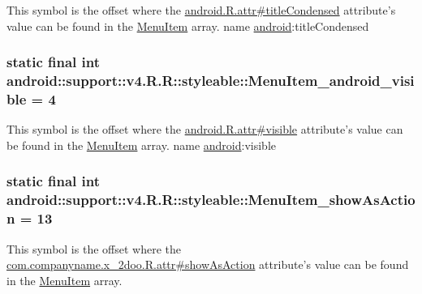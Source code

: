 This symbol is the offset where the \hyperlink{}{android.R.attr\#titleCondensed} attribute's value can be found in the \hyperlink{classandroid_1_1support_1_1v4_1_1_r_1_1styleable_05493a7eeaa2bff09c4fbacbfb671ccc}{MenuItem} array.  name \hyperlink{namespaceandroid}{android}:titleCondensed \hypertarget{classandroid_1_1support_1_1v4_1_1_r_1_1styleable_f5ec2e318cacb05a88574400015d117b}{
\subsubsection[{MenuItem\_\-android\_\-visible}]{\setlength{\rightskip}{0pt plus 5cm}static final int android::support::v4.R.R::styleable::MenuItem\_\-android\_\-visible = 4}}
\label{classandroid_1_1support_1_1v4_1_1_r_1_1styleable_f5ec2e318cacb05a88574400015d117b}


This symbol is the offset where the \hyperlink{}{android.R.attr\#visible} attribute's value can be found in the \hyperlink{classandroid_1_1support_1_1v4_1_1_r_1_1styleable_05493a7eeaa2bff09c4fbacbfb671ccc}{MenuItem} array.  name \hyperlink{namespaceandroid}{android}:visible \hypertarget{classandroid_1_1support_1_1v4_1_1_r_1_1styleable_97f9c113efa1633c7665e13fd89ade63}{
\subsubsection[{MenuItem\_\-showAsAction}]{\setlength{\rightskip}{0pt plus 5cm}static final int android::support::v4.R.R::styleable::MenuItem\_\-showAsAction = 13}}
\label{classandroid_1_1support_1_1v4_1_1_r_1_1styleable_97f9c113efa1633c7665e13fd89ade63}


This symbol is the offset where the \hyperlink{classcom_1_1companyname_1_1x__2doo_1_1_r_1_1attr_5b7e0b00999850a072b8c178d14a5a76}{com.companyname.x\_\-2doo.R.attr\#showAsAction} attribute's value can be found in the \hyperlink{classandroid_1_1support_1_1v4_1_1_r_1_1styleable_05493a7eeaa2bff09c4fbacbfb671ccc}{MenuItem} array.

